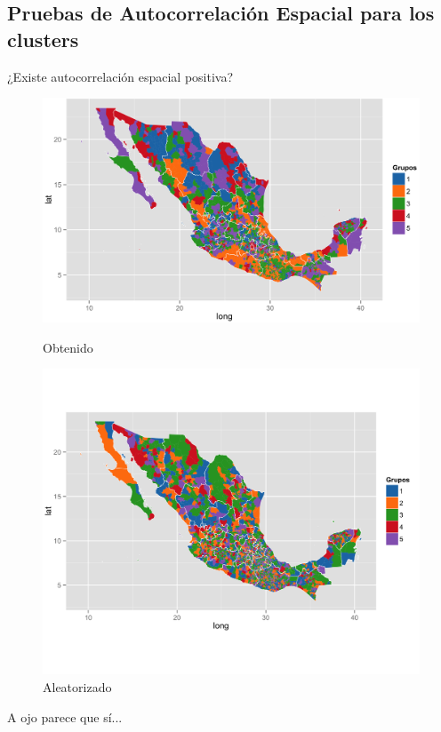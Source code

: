 \documentclass{beamer}
\begin{document}
\subsection{Pruebas de Autocorrelación Espacial para los clusters}
\begin{frame}{¿Existe autocorrelación espacial positiva?}
  \begin{figure}[!ht]
    \includegraphics[width=\linewidth]{./maps/map5g.png}
    \caption{Obtenido}
  \endminipage\hfill
    \includegraphics[width=\linewidth]{./maps/rmap5g.png}
    \caption{Aleatorizado}
  \endminipage\hfill
  \end{figure}
  A ojo parece que sí...
\end{frame}
\end{document}
